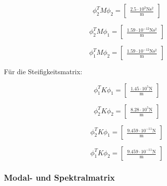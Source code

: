 \documentclass[
  letterpaper,
  DIV=11]{scrreprt}
\begin{document}
\begin{equation}\phi_{2}^{T} M \phi_{2} = \left[\begin{matrix}\frac{2.5 \cdot 10^{3} \text{N} \text{s}^{2}}{\text{m}}\end{matrix}\right]\end{equation}

\begin{equation}\phi_{2}^{T} M \phi_{1} = \left[\begin{matrix}\frac{1.59 \cdot 10^{-12} \text{N} \text{s}^{2}}{\text{m}}\end{matrix}\right]\end{equation}

\begin{equation}\phi_{1}^{T} M \phi_{2} = \left[\begin{matrix}\frac{1.59 \cdot 10^{-12} \text{N} \text{s}^{2}}{\text{m}}\end{matrix}\right]\end{equation}

Für die Steifigkeitsmatrix:

\begin{equation}\phi_{1}^{T} K \phi_{1} = \left[\begin{matrix}\frac{1.45 \cdot 10^{5} \text{N}}{\text{m}}\end{matrix}\right]\end{equation}

\begin{equation}\phi_{2}^{T} K \phi_{2} = \left[\begin{matrix}\frac{8.28 \cdot 10^{5} \text{N}}{\text{m}}\end{matrix}\right]\end{equation}

\begin{equation}\phi_{2}^{T} K \phi_{1} = \left[\begin{matrix}\frac{9.459 \cdot 10^{-11} \text{N}}{\text{m}}\end{matrix}\right]\end{equation}

\begin{equation}\phi_{1}^{T} K \phi_{2} = \left[\begin{matrix}\frac{9.459 \cdot 10^{-11} \text{N}}{\text{m}}\end{matrix}\right]\end{equation}

\hypertarget{modal--und-spektralmatrix-3}{%
\subsubsection{Modal- und
Spektralmatrix}\label{modal--und-spektralmatrix-3}}
\end{document}
